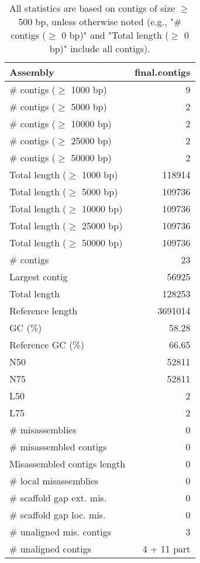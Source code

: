 \documentclass[12pt,a4paper]{article}
\begin{document}
\begin{table}[ht]
\begin{center}
\caption{All statistics are based on contigs of size $\geq$ 500 bp, unless otherwise noted (e.g., "\# contigs ($\geq$ 0 bp)" and "Total length ($\geq$ 0 bp)" include all contigs).}
\begin{tabular}{|l*{1}{|r}|}
\hline
Assembly & final.contigs \\ \hline
\# contigs ($\geq$ 1000 bp) & 9 \\ \hline
\# contigs ($\geq$ 5000 bp) & 2 \\ \hline
\# contigs ($\geq$ 10000 bp) & 2 \\ \hline
\# contigs ($\geq$ 25000 bp) & 2 \\ \hline
\# contigs ($\geq$ 50000 bp) & 2 \\ \hline
Total length ($\geq$ 1000 bp) & 118914 \\ \hline
Total length ($\geq$ 5000 bp) & 109736 \\ \hline
Total length ($\geq$ 10000 bp) & 109736 \\ \hline
Total length ($\geq$ 25000 bp) & 109736 \\ \hline
Total length ($\geq$ 50000 bp) & 109736 \\ \hline
\# contigs & 23 \\ \hline
Largest contig & 56925 \\ \hline
Total length & 128253 \\ \hline
Reference length & 3691014 \\ \hline
GC (\%) & 58.28 \\ \hline
Reference GC (\%) & 66.65 \\ \hline
N50 & 52811 \\ \hline
N75 & 52811 \\ \hline
L50 & 2 \\ \hline
L75 & 2 \\ \hline
\# misassemblies & 0 \\ \hline
\# misassembled contigs & 0 \\ \hline
Misassembled contigs length & 0 \\ \hline
\# local misassemblies & 0 \\ \hline
\# scaffold gap ext. mis. & 0 \\ \hline
\# scaffold gap loc. mis. & 0 \\ \hline
\# unaligned mis. contigs & 3 \\ \hline
\# unaligned contigs & 4 + 11 part \\ \hline

\end{tabular}
\end{center}
\end{table}
\end{document}
